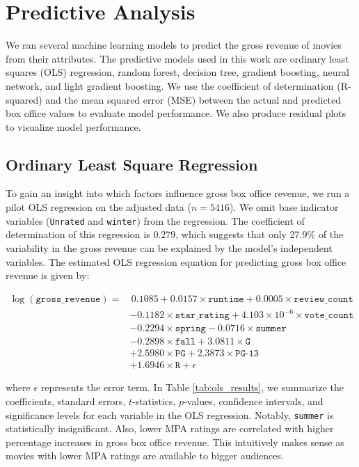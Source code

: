 \documentclass{article}
\begin{document}
\section{Predictive Analysis}
We ran several machine learning models to predict the gross revenue of movies from their attributes. The predictive models used in this work are ordinary least squares (OLS) regression, random forest, decision tree, gradient boosting, neural network, and light gradient boosting. We use the coefficient of determination (R-squared) and the mean squared error (MSE) between the actual and predicted box office values to evaluate model performance. We also produce residual plots to visualize model performance.

\subsection{Ordinary Least Square Regression}
To gain an insight into which factors influence gross box office revenue, we run a pilot OLS regression on the adjusted data ($n=5416$). We omit base indicator variables (\texttt{Unrated} and \texttt{winter}) from the regression. The coefficient of determination of this regression is $0.279$, which suggests that only 27.9\% of the variability in the gross revenue can be explained by the model's independent variables. The estimated OLS regression equation for predicting gross box office revenue is given by:

\begin{align*}
\log{(\texttt{gross\_revenue})} = & \, 0.1085 + 0.0157 \times \texttt{runtime} + 0.0005 \times \texttt{review\_count} \\
& - 0.1182 \times \texttt{star\_rating} + 4.103 \times 10^{-6} \times \texttt{vote\_count} \\
& - 0.2294 \times \texttt{spring} - 0.0716 \times \texttt{summer} \\
& - 0.2898 \times \texttt{fall} + 3.0811 \times \texttt{G} \\
& + 2.5980 \times \texttt{PG} + 2.3873 \times \texttt{PG-13} \\
& + 1.6946 \times \texttt{R} + \epsilon
\end{align*}

where $\epsilon$ represents the error term. In Table \ref{tab:ols_results}, we summarize the coefficients, standard errors, $t$-statistics, $p$-values, confidence intervals, and significance levels for each variable in the OLS regression. Notably, \texttt{summer} is statistically insignificant. Also, lower MPA ratings are correlated with higher percentage increases in gross box office revenue. This intuitively makes sense as movies with lower MPA ratings are available to bigger audiences. 
\end{document}
